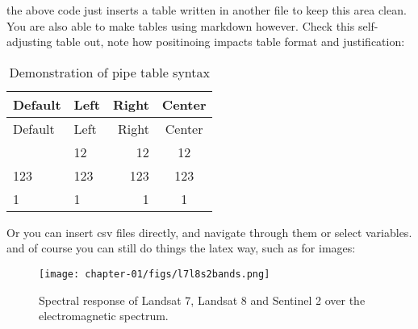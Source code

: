 \documentclass[
  a4paper,
  twoside]{uoe-thesis-template}
\begin{document}
\begin{tcolorbox}[enhanced jigsaw, opacitybacktitle=0.6, colbacktitle=quarto-callout-note-color!10!white, colframe=quarto-callout-note-color-frame, leftrule=.75mm, bottomtitle=1mm, toptitle=1mm, toprule=.15mm, colback=white, left=2mm, titlerule=0mm, opacityback=0, rightrule=.15mm, arc=.35mm, title=\textcolor{quarto-callout-note-color}{\faInfo}\hspace{0.5em}{Note}, bottomrule=.15mm, coltitle=black, breakable]

the above code just inserts a table written in another file to keep this
area clean. You are also able to make tables using markdown however.
Check this self-adjusting table out, note how positinoing impacts table
format and justification:

\end{tcolorbox}

\begin{longtable}[]{@{}llrc@{}}
\caption{Demonstration of pipe table syntax}\tabularnewline
\toprule\noalign{}
Default & Left & Right & Center \\
\midrule\noalign{}
\endfirsthead
\toprule\noalign{}
Default & Left & Right & Center \\
\midrule\noalign{}
\endhead
\bottomrule\noalign{}
\endlastfoot
12 & 12 & 12 & 12 \\
123 & 123 & 123 & 123 \\
1 & 1 & 1 & 1 \\
\end{longtable}

\newpage{}

\begin{tcolorbox}[enhanced jigsaw, opacitybacktitle=0.6, colbacktitle=quarto-callout-note-color!10!white, colframe=quarto-callout-note-color-frame, leftrule=.75mm, bottomtitle=1mm, toptitle=1mm, toprule=.15mm, colback=white, left=2mm, titlerule=0mm, opacityback=0, rightrule=.15mm, arc=.35mm, title=\textcolor{quarto-callout-note-color}{\faInfo}\hspace{0.5em}{Note}, bottomrule=.15mm, coltitle=black, breakable]

Or you can insert csv files directly, and navigate through them or
select variables. and of course you can still do things the latex way,
such as for images:

\end{tcolorbox}

\begin{figure}[h]
    \centering
    \texttt{[image: chapter-01/figs/l7l8s2bands.png]}
    \caption{Spectral response of Landsat 7, Landsat 8 and Sentinel 2 over the electromagnetic spectrum.}
    \label{l7l8s2bands}
\end{figure}
\end{document}
